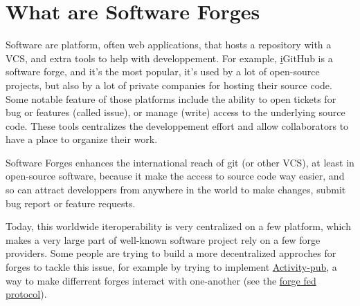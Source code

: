 \section{What are Software Forges}

Software are platform, often web applications, that hosts a repository with a VCS, and extra tools to help with developpement.
For example, \href{https://github.com}i{GitHub} is a software forge, and it's the most popular, it's used by a lot of open-source projects, but also by a lot of private companies for hosting their source code.
Some notable feature of those platforms include the ability to open tickets for bug or features (called issue), or manage (write) access to the underlying source code.
These tools centralizes the developpement effort and allow collaborators to have a place to organize their work.

Software Forges enhances the international reach of git (or other VCS), at least in open-source software, because it make the access to source code way easier,
and so can attract developpers from anywhere in the world to make changes, submit bug report or feature requests.

Today, this worldwide iteroperability is very centralized on a few platform, which makes a very large part of well-known software project rely on a few forge providers.
Some people are trying to build a more decentralized approches for forges to tackle this issue, for example by trying to implement \href{}{Activity-pub}, a way to make differrent forges interact with one-another
(see the \href{https://forgefed.org/}{forge fed protocol}).
